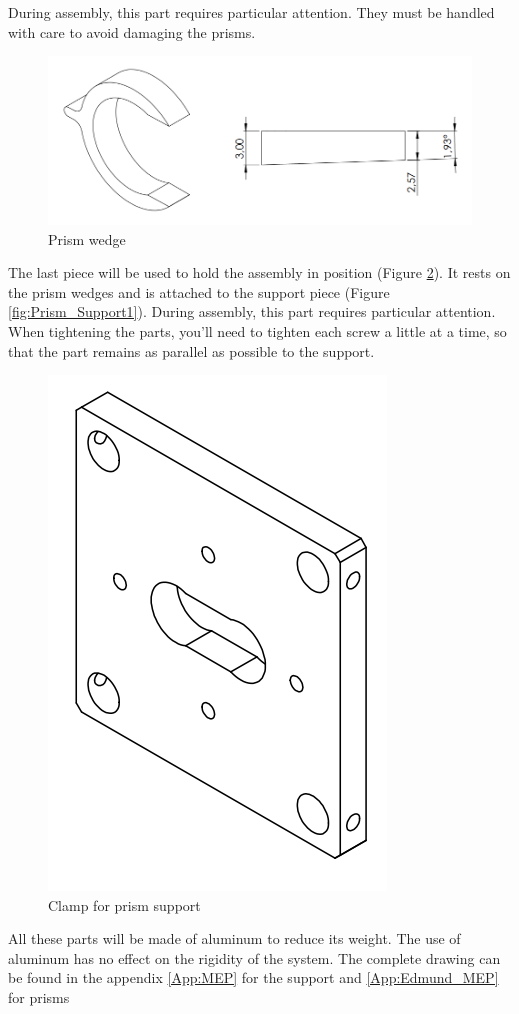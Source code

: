 During assembly, this part requires particular attention. They must be handled with care to avoid damaging the prisms.
\begin{figure}[H]
    \centering
    \includegraphics[scale=0.7]{assets/figures/Mechanical Design/MaintientPrism2.png}
    \caption{Prism wedge}
    \label{fig:Prism_Support2}
\end{figure}
The last piece will be used to hold the assembly in position (Figure \ref{fig:Prism_Support3}). It rests on the prism wedges 
and is attached to the support piece (Figure \ref{fig:Prism_Support1}). \newline
During assembly, this part requires particular attention. When tightening the parts, you'll need to tighten each screw a 
little at a time, so that the part remains as parallel as possible to the support.
\begin{figure}[H]
    \centering
    \includegraphics[scale=0.8]{assets/figures/Mechanical Design/MaintientPrism3.png}
    \caption{Clamp for prism support}
    \label{fig:Prism_Support3}
\end{figure}
All these parts will be made of aluminum to reduce its weight. The use of aluminum has no effect on the rigidity of the system.
\bigbreak
The complete drawing can be found in the appendix \ref{App:MEP} for the support and \ref{App:Edmund_MEP} for prisms
